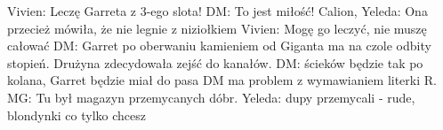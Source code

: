 \documentclass[10pt,twoside,twocolumn]{book}
\begin{document}
%    
%       
Vivien: Leczę Garreta z 3-ego slota!
DM: To jest miłość!
Calion, Yeleda: Ona przecież mówiła, że nie legnie z niziołkiem
Vivien: Mogę go leczyć, nie muszę całować
%    
%       
DM: Garret po oberwaniu kamieniem od Giganta ma na czole odbity stopień.
%    
%       
Drużyna zdecydowała zejść do kanałów.
DM: ścieków będzie tak po kolana, Garret będzie miał do pasa
%    
%       
DM ma problem z wymawianiem literki R.
MG: Tu był magazyn przemycanych dóbr.
Yeleda: dupy przemycali - rude, blondynki co tylko chcesz
%    
\end{document}
